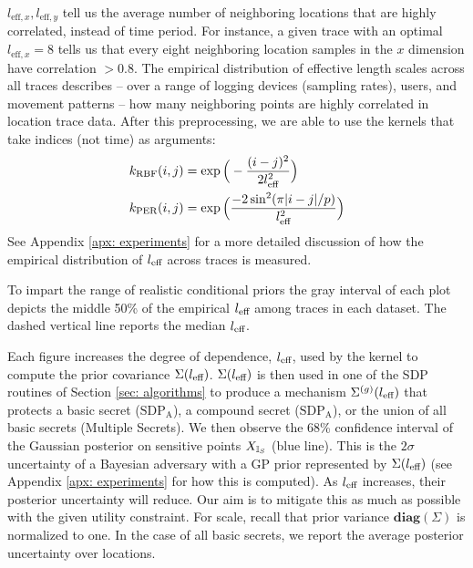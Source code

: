 $l_{\text{eff},x},l_{\text{eff},y}$ tell us the average number of neighboring locations that are highly correlated, instead of time period. For instance, a given trace with an optimal $l_{\text{eff},x} = 8$ tells us that every eight neighboring location samples in the $x$ dimension have correlation $> 0.8$. The empirical distribution of effective length scales across all traces describes -- over a range of logging devices (sampling rates), users, and movement patterns -- how many neighboring points are highly correlated in location trace data. After this preprocessing, we are able to use the kernels that take indices (not time) as arguments: 
\begin{align*}
	k_{\text{RBF}}(i, j) 
	&=  \exp \Big( -\frac{(i - j)^2}{2l_{\text{eff}}^2} \Big) \\
	k_{\text{PER}}(i, j) 
	&=  \exp \Big(  \frac{-2 \sin^2(\pi |i - j| / p)}{l_{\text{eff}}^2} \Big)
\end{align*}
See Appendix \ref{apx: experiments} for a more detailed discussion of how the empirical distribution of $l_{\text{eff}}$ across traces is measured. 

To impart the range of realistic conditional priors the gray interval of each plot depicts the middle 50\% of the empirical $l_{\text{eff}}$ among traces in each dataset. The dashed vertical line reports the median $l_{\text{eff}}$. 




Each figure increases the degree of dependence, $l_{\text{eff}}$, used by the kernel to compute the prior covariance $\Sigma(l_{\text{eff}})$. $\Sigma(l_{\text{eff}})$ is then used in one of the SDP routines of Section \ref{sec: algorithms} to produce a mechanism $\Sigma^{(g)}(l_{\text{eff}})$ that protects a basic secret ($\text{SDP}_\text{A}$), a compound secret ($\text{SDP}_\text{A}$), or the union of all basic secrets (Multiple Secrets). We then observe the 68\% confidence interval of the Gaussian posterior on sensitive points ${X_{\mathbb{I}_S}}$ (blue line). This is the $2\sigma$ uncertainty of a Bayesian adversary with a GP prior represented by $\Sigma(l_{\text{eff}})$ (see Appendix \ref{apx: experiments} for how this is computed). As $l_{\text{eff}}$ increases, their posterior uncertainty will reduce. Our aim is to mitigate this as much as possible with the given utility constraint. For scale, recall that prior variance $\textbf{diag}(\Sigma)$ is normalized to one. In the case of all basic secrets, we report the average posterior uncertainty over locations. 

